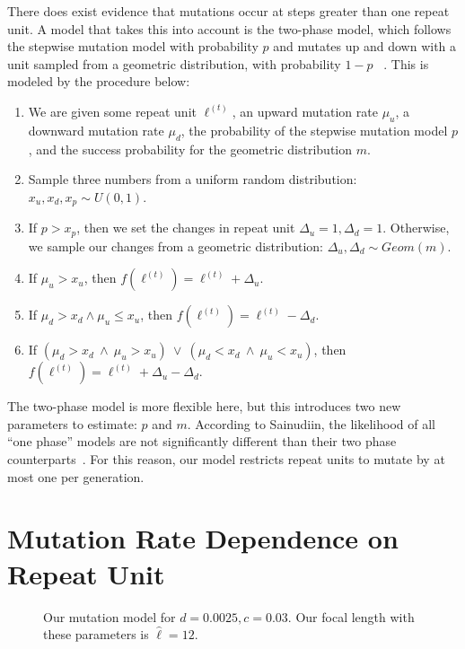 There does exist evidence that mutations occur at steps greater than one repeat unit.
A model that takes this into account is the two-phase model, which follows the stepwise mutation model with probability
$p$ and mutates up and down with a unit sampled from a geometric distribution, with probability $1-p$
~\cite{dirienzoMutationalProcessesSimplesequence1994}.
This is modeled by the procedure below:
\begin{enumerate}
    \item We are given some repeat unit $\ell^{(t)}$, an upward mutation rate $\mu_u$, a
        downward mutation rate $\mu_d$, the probability of the stepwise mutation model $p$, and the success probability
        for the geometric distribution $m$.
    \item Sample three numbers from a uniform random distribution: $x_u, x_d, x_p \sim U(0, 1)$.
    \item If $p > x_p$, then we set the changes in repeat unit $\Delta_u = 1, \Delta_d = 1$.
        Otherwise, we sample our changes from a geometric distribution:
        $\Delta_u, \Delta_d \sim \mathit{Geom}(m)$.
    \item If $\mu_u > x_u$, then $f(\ell^{(t)}) = \ell^{(t)} + \Delta_u$.
    \item If $\mu_d > x_d \land \mu_u \leq x_u$, then $f(\ell^{(t)}) = \ell^{(t)} - \Delta_d$.
    \item If $(\mu_d > x_d \ \land \ \mu_u > x_u) \ \lor \ (\mu_d < x_d \ \land \ \mu_u < x_u)$,
        then $f(\ell^{(t)}) = \ell^{(t)} + \Delta_u - \Delta_d$.
\end{enumerate}

The two-phase model is more flexible here, but this introduces two new parameters to estimate: $p$ and $m$.
According to Sainudiin, the likelihood of all ``one phase'' models are
not significantly different than their two phase counterparts~\cite{sainudiinMicrosatelliteMutationModels2004}.
For this reason, our model restricts repeat units to mutate by at most one per generation.

\section{Mutation Rate Dependence on Repeat Unit}\label{sec:mutationRateDependenceOnRepeatUnit}
\begin{figure}[t]
    \centering{}
    \caption{Our mutation model for $d=0.0025, c=0.03$.
    Our focal length with these parameters is $\hat{\ell}=12$.}\label{fig:mutationModel}
\end{figure}

